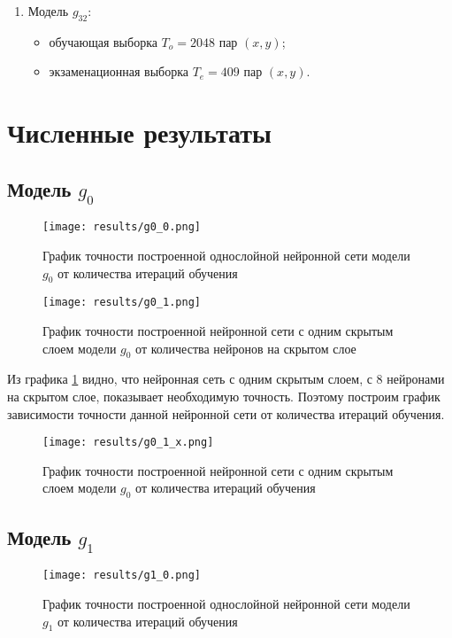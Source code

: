 \begin{enumerate}
	\item Модель $g_{32}$:
	\begin{itemize}
		\item обучающая выборка $T_o=2048$ пар $(x, y)$;
		\item экзаменационная выборка $T_e=409$ пар $(x, y)$.
	\end{itemize}
	
\end{enumerate}

\newpage
\section{Численные результаты}
\subsection{Модель $g_0$}

\begin{figure}[H]
	\texttt{[image: results/g0\_0.png]}
	
	\caption{График точности построенной однослойной нейронной сети модели $g_0$ от количества итераций обучения}
	
\end{figure}

\begin{figure}[H]
	\texttt{[image: results/g0\_1.png]}
	
	\caption{График точности построенной нейронной сети с одним скрытым слоем модели $g_0$ от количества нейронов на скрытом слое}
	\label{graphic0}
\end{figure}

Из графика \ref{graphic0} видно, что нейронная сеть с одним скрытым слоем, с 8 нейронами на скрытом слое, показывает необходимую точность. Поэтому построим график зависимости точности данной нейронной сети от количества итераций обучения.

\begin{figure}[H]
	\texttt{[image: results/g0\_1\_x.png]}
	
	\caption{График точности построенной нейронной сети с одним скрытым слоем модели $g_0$  от количества итераций обучения}
\end{figure}

\subsection{Модель $g_1$}
\begin{figure}[H]
	\texttt{[image: results/g1\_0.png]}
	
	\caption{График точности построенной однослойной нейронной сети модели $g_1$ от количества итераций обучения}
	
\end{figure}

